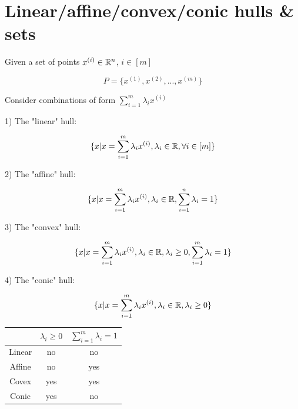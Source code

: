 
\section{Linear/affine/convex/conic hulls \& sets}
Given a set of points $x^{(i)} \in \mathbb{R}^n$, $i\in [m]$

\begin{equation*}
P = \{x^{(1)}, x^{(2)},..., x^{(m)} \}
\end{equation*}

Consider combinations of form $\sum^m_{i=1} \lambda_i x^{(i)}$

1) The "linear" hull: 

\begin{equation*}
\{x|x = \sum^m_{i=1} \lambda_i x^{(i)}, \lambda_i\in \mathbb{R}, \forall i\in [m] \}
\end{equation*}

2) The "affine" hull: 

\begin{equation*}
\{x|x = \sum^m_{i=1} \lambda_i x^{(i)}, \lambda_i\in \mathbb{R}, \sum^n_{i=1}\lambda_i = 1 \}
\end{equation*}


3) The "convex" hull: 

\begin{equation*}
\{x|x = \sum^m_{i=1} \lambda_i x^{(i)}, \lambda_i\in \mathbb{R}, \lambda_i \geq 0, \sum^m_{i=1}\lambda_i = 1 \}
\end{equation*}


4) The "conic" hull: 

\begin{equation*}
\{x|x = \sum^m_{i=1} \lambda_i x^{(i)}, \lambda_i\in \mathbb{R}, \lambda_i \geq 0 \}
\end{equation*}


\begin{center}
	\begin{tabular}{|c|c|c|}
	\hline  
   & $\lambda_i \geq 0$   & $\sum^m_{i=1}\lambda_i = 1$ \\
	\hline  
Linear&  no  & no \\
	\hline  
Affine&  no  &yes  \\
	\hline 
Covex&  yes  & yes \\
	\hline  
Conic&  yes  &  no\\
	\hline 
\end{tabular}
\end{center}



